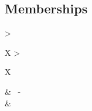 \subsection*{Memberships}

\begin{center}
  \begin{tabularx}{\textwidth} { 
      >{\raggedright\arraybackslash}X 
    >{\raggedright\arraybackslash}X  }

    \csvreader[memberships]{data/memberships.csv}{}{
    \textbf{\role} & \start\ -\ \fin\\
    \textit{\org} & \\
    }
  \end{tabularx}
\end{center}
